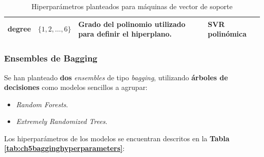 \begin{table}[h]
{\begin{tabular}{@{}rlll@{}}
			\rowcolor[HTML]{EFEFEF} 
			degree                                      & $\{1, 2, \dots, 6\}$ & Grado del polinomio utilizado para definir el hiperplano.                                                                                                                                                                                & SVR polinómica       \\ \bottomrule
		\end{tabular}%
	}
	\captionsetup{belowskip=-40pt, justification=centering}
	\caption{Hiperparámetros planteados para máquinas de vector de soporte}
	\label{tab:ch5svrhyperparameters}
\end{table}

\subsubsection{Ensembles de Bagging}

Se han planteado \textbf{dos} \textit{ensembles} de tipo \textit{bagging}, utilizando \textbf{árboles de decisiones} como modelos sencillos a agrupar:

\begin{itemize}[parsep=1pt, itemsep=0pt, topsep=1pt]
	\item \textit{Random Forests}.
	\item \textit{Extremely Randomized Trees}.
\end{itemize}

Los hiperparámetros de los modelos se encuentran descritos en la \textbf{Tabla \ref{tab:ch5bagginghyperparameters}}:

